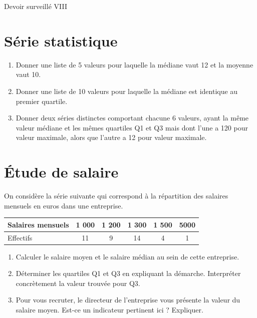 \documentclass[french]{book}
\begin{document}
\begin{center}
\huge{ Devoir surveillé VIII}
\end{center}

\section*{Série statistique}

\begin{enumerate}
\item Donner une liste de 5 valeurs pour laquelle la médiane vaut 12 et la moyenne vaut 10.

\item Donner une liste de 10 valeurs pour laquelle la médiane est identique au premier quartile.
\item Donner deux séries distinctes comportant chacune 6 valeurs, ayant la même valeur médiane et les mêmes quartiles Q1 et Q3 mais dont l’une a 120 pour valeur maximale, alors que l’autre a 12 pour valeur maximale. \\
\end{enumerate}
 
\section*{Étude de salaire}

On considère la série suivante qui correspond à la répartition des salaires mensuels en euros dans une entreprise.

\begin{center}
   \begin{tabular}{| l || c | c | c | c | c |}
     \hline
     Salaires mensuels & 1 000 & 1 200 & 1 300 & 1 500 &  5000 \\ \hline
     Effectifs & 11 & 9 & 14 & 4 & 1 \\ 
     \hline
   \end{tabular}
 \end{center}

\begin{enumerate}
\item Calculer le salaire moyen et le salaire médian au sein de cette entreprise.

\item Déterminer les quartiles Q1 et Q3 en expliquant la démarche.
Interpréter concrètement la valeur trouvée pour Q3.

\item Pour vous recruter, le directeur de l’entreprise vous présente la valeur du salaire moyen. Est-ce un indicateur pertinent ici ? Expliquer.

\end{enumerate}
\end{document}
